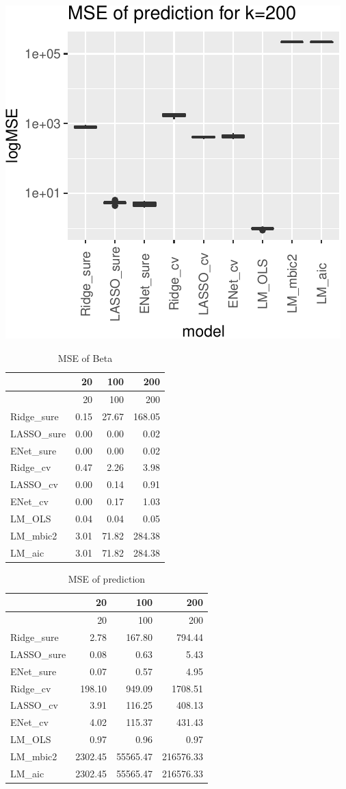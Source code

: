 \documentclass[
]{article}
\begin{document}
\includegraphics[width=0.8\linewidth]{report_files/figure-latex/unnamed-chunk-16-6}

\begin{longtable}[]{@{}lrrr@{}}
\caption{MSE of Beta}\tabularnewline
\toprule
& 20 & 100 & 200 \\
\midrule
\endfirsthead
\toprule
& 20 & 100 & 200 \\
\midrule
\endhead
Ridge\_sure & 0.15 & 27.67 & 168.05 \\
LASSO\_sure & 0.00 & 0.00 & 0.02 \\
ENet\_sure & 0.00 & 0.00 & 0.02 \\
Ridge\_cv & 0.47 & 2.26 & 3.98 \\
LASSO\_cv & 0.00 & 0.14 & 0.91 \\
ENet\_cv & 0.00 & 0.17 & 1.03 \\
LM\_OLS & 0.04 & 0.04 & 0.05 \\
LM\_mbic2 & 3.01 & 71.82 & 284.38 \\
LM\_aic & 3.01 & 71.82 & 284.38 \\
\bottomrule
\end{longtable}

\begin{longtable}[]{@{}lrrr@{}}
\caption{MSE of prediction}\tabularnewline
\toprule
& 20 & 100 & 200 \\
\midrule
\endfirsthead
\toprule
& 20 & 100 & 200 \\
\midrule
\endhead
Ridge\_sure & 2.78 & 167.80 & 794.44 \\
LASSO\_sure & 0.08 & 0.63 & 5.43 \\
ENet\_sure & 0.07 & 0.57 & 4.95 \\
Ridge\_cv & 198.10 & 949.09 & 1708.51 \\
LASSO\_cv & 3.91 & 116.25 & 408.13 \\
ENet\_cv & 4.02 & 115.37 & 431.43 \\
LM\_OLS & 0.97 & 0.96 & 0.97 \\
LM\_mbic2 & 2302.45 & 55565.47 & 216576.33 \\
LM\_aic & 2302.45 & 55565.47 & 216576.33 \\
\bottomrule
\end{longtable}
\end{document}
